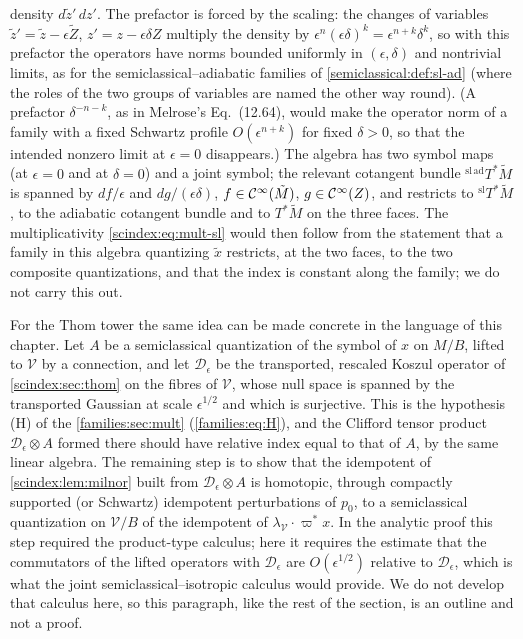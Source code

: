 density $d\tilde z'\,dz'$. The prefactor is forced by the scaling: the changes of
variables $\tilde z'=\tilde z-\epsilon\tilde Z$, $z'=z-\epsilon\delta Z$ multiply
the density by $\epsilon^n(\epsilon\delta)^k=\epsilon^{n+k}\delta^k$, so with this
prefactor the operators have norms bounded uniformly in $(\epsilon,\delta)$ and
nontrivial limits, as for the semiclassical--adiabatic families of
\cref{semiclassical:def:sl-ad} (where the roles of the two groups of variables are
named the other way round). (A
prefactor $\delta^{-n-k}$, as in Melrose's Eq.~(12.64), would make the operator
norm of a family with a fixed Schwartz profile $O(\epsilon^{n+k})$ for fixed
$\delta>0$, so that the intended nonzero limit at $\epsilon=0$ disappears.) The
algebra has two symbol maps (at
$\epsilon=0$ and at $\delta=0$) and a joint symbol; the relevant cotangent
bundle ${}^{\mathrm{sl\,ad}}T^*\tilde M$ is spanned by $df/\epsilon$ and
$dg/(\epsilon\delta)$, $f\in\mathcal{C}^\infty(\tilde M)$, $g\in\mathcal{C}^\infty(Z)$, and restricts to
${}^{\mathrm{sl}}T^*\tilde M$, to the adiabatic cotangent bundle and to $T^*\tilde M$
on the three faces. The multiplicativity \eqref{scindex:eq:mult-sl} would then
follow from the statement that a family in this algebra quantizing $\tilde x$
restricts, at the two faces, to the two composite quantizations, and that the
index is constant along the family; we do not carry this out.

For the Thom tower the same idea can be made concrete in the language of this
chapter. Let $A$ be a semiclassical quantization of the symbol of $x$ on $M/B$,
lifted to $\mathcal V$ by a connection, and let $\mathcal D_\epsilon$ be the
transported, rescaled Koszul operator of \cref{scindex:sec:thom} on the fibres of
$\mathcal V$, whose null space is spanned by the transported Gaussian at scale
$\epsilon^{1/2}$ and which is surjective. This is the hypothesis (H) of the
\cref{families:sec:mult} (\eqref{families:eq:H}), and the Clifford tensor product
$\mathcal D_\epsilon\otimes A$ formed there should have relative index equal to
that of $A$, by the same linear algebra. The remaining step is to show that the
idempotent of \cref{scindex:lem:milnor} built from $\mathcal D_\epsilon\otimes A$
is homotopic, through compactly supported (or Schwartz) idempotent perturbations
of $p_0$, to a semiclassical quantization on $\mathcal V/B$ of the idempotent of
$\lambda_{\mathcal V}\cdot\varpi^*x$. In the analytic proof this step required the
product-type calculus; here it requires the estimate that the commutators of the
lifted operators with $\mathcal D_\epsilon$ are $O(\epsilon^{1/2})$ relative to
$\mathcal D_\epsilon$, which is what the joint semiclassical--isotropic
calculus would provide. We do not develop that calculus here, so this
paragraph, like the rest of the section, is an outline and not a proof.

